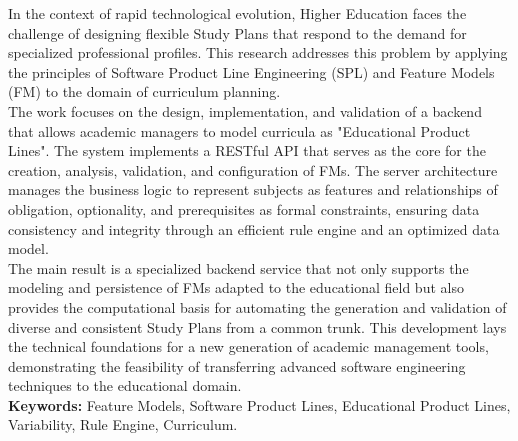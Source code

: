 {
In the context of rapid technological evolution, Higher Education faces the challenge of designing flexible Study Plans that respond to the demand for specialized professional profiles. This research addresses this problem by applying the principles of Software Product Line Engineering (SPL) and Feature Models (FM) to the domain of curriculum planning.\\
The work focuses on the design, implementation, and validation of a backend that allows academic managers to model curricula as "Educational Product Lines". The system implements a RESTful API that serves as the core for the creation, analysis, validation, and configuration of FMs. The server architecture manages the business logic to represent subjects as features and relationships of obligation, optionality, and prerequisites as formal constraints, ensuring data consistency and integrity through an efficient rule engine and an optimized data model.\\
The main result is a specialized backend service that not only supports the modeling and persistence of FMs adapted to the educational field but also provides the computational basis for automating the generation and validation of diverse and consistent Study Plans from a common trunk. This development lays the technical foundations for a new generation of academic management tools, demonstrating the feasibility of transferring advanced software engineering techniques to the educational domain.\\
\textbf{Keywords:} Feature Models, Software Product Lines, Educational Product Lines, Variability, Rule Engine, Curriculum.
}
